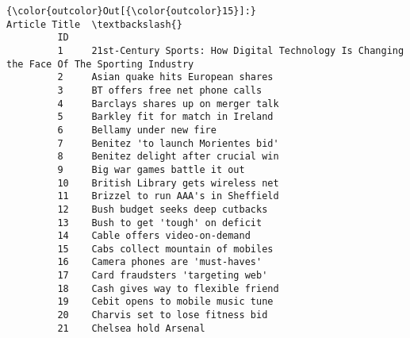 \documentclass[11pt]{article}
\begin{document}
\begin{Verbatim}[commandchars=\\\{\}]
{\color{outcolor}Out[{\color{outcolor}15}]:}                                                                                   Article Title  \textbackslash{}
         ID                                                                                                
         1     21st-Century Sports: How Digital Technology Is Changing the Face Of The Sporting Industry   
         2     Asian quake hits European shares                                                            
         3     BT offers free net phone calls                                                              
         4     Barclays shares up on merger talk                                                           
         5     Barkley fit for match in Ireland                                                            
         6     Bellamy under new fire                                                                      
         7     Benitez 'to launch Morientes bid'                                                           
         8     Benitez delight after crucial win                                                           
         9     Big war games battle it out                                                                 
         10    British Library gets wireless net                                                           
         11    Brizzel to run AAA's in Sheffield                                                           
         12    Bush budget seeks deep cutbacks                                                             
         13    Bush to get 'tough' on deficit                                                              
         14    Cable offers video-on-demand                                                                
         15    Cabs collect mountain of mobiles                                                            
         16    Camera phones are 'must-haves'                                                              
         17    Card fraudsters 'targeting web'                                                             
         18    Cash gives way to flexible friend                                                           
         19    Cebit opens to mobile music tune                                                            
         20    Charvis set to lose fitness bid                                                             
         21    Chelsea hold Arsenal                                                                        

\end{Verbatim}
\end{document}
